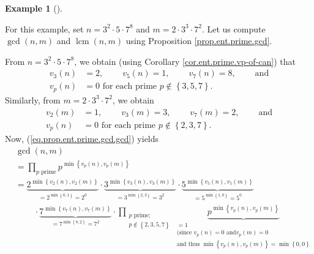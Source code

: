 \documentclass[numbers=enddot,12pt,final,onecolumn,notitlepage]{scrartcl}%
\numberwithin{exer}{subsection}
\theoremstyle{definition}
\newtheorem{exam}[theo]{Example}
\newenvironment{example}[1][]
{\begin{exam}[#1]\begin{leftbar}}
{\end{leftbar}\end{exam}}
\let\prodnonlimits\prod
\renewcommand{\prod}{\prodnonlimits\limits}
\begin{document}
\begin{example}
For this example, set $n=3^{2}\cdot5\cdot7^{8}$ and $m=2\cdot3^{3}\cdot7^{2}$.
Let us compute $\gcd\left(  n,m\right)  $ and $\operatorname{lcm}\left(
n,m\right)  $ using Proposition \ref{prop.ent.prime.gcd}.

From $n=3^{2}\cdot5\cdot7^{8}$, we obtain (using Corollary
\ref{cor.ent.prime.vp-of-can}) that%
\begin{align*}
v_{3}\left(  n\right)   &  =2,\ \ \ \ \ \ \ \ \ \ v_{5}\left(  n\right)
=1,\ \ \ \ \ \ \ \ \ \ v_{7}\left(  n\right)
=8,\ \ \ \ \ \ \ \ \ \ \text{and}\\
v_{p}\left(  n\right)   &  =0\text{ for each prime }p\notin\left\{
3,5,7\right\}  .
\end{align*}
Similarly, from $m=2\cdot3^{3}\cdot7^{2}$, we obtain%
\begin{align*}
v_{2}\left(  m\right)   &  =1,\ \ \ \ \ \ \ \ \ \ v_{3}\left(  m\right)
=3,\ \ \ \ \ \ \ \ \ \ v_{7}\left(  m\right)
=2,\ \ \ \ \ \ \ \ \ \ \text{and}\\
v_{p}\left(  n\right)   &  =0\text{ for each prime }p\notin\left\{
2,3,7\right\}  .
\end{align*}
Now, (\ref{eq.prop.ent.prime.gcd.gcd}) yields%
\begin{align*}
&  \gcd\left(  n,m\right) \\
&  =\prod_{p\text{ prime}}p^{\min\left\{  v_{p}\left(  n\right)  ,v_{p}\left(
m\right)  \right\}  }\\
&  =\underbrace{2^{\min\left\{  v_{2}\left(  n\right)  ,v_{2}\left(  m\right)
\right\}  }}_{=2^{\min\left\{  0,1\right\}  }=2^{0}}\cdot\underbrace{3^{\min
\left\{  v_{3}\left(  n\right)  ,v_{3}\left(  m\right)  \right\}  }}%
_{=3^{\min\left\{  2,3\right\}  }=3^{2}}\cdot\underbrace{5^{\min\left\{
v_{5}\left(  n\right)  ,v_{5}\left(  m\right)  \right\}  }}_{=5^{\min\left\{
1,0\right\}  }=5^{0}}\\
&  \ \ \ \ \ \ \ \ \ \ \cdot\underbrace{7^{\min\left\{  v_{7}\left(  n\right)
,v_{7}\left(  m\right)  \right\}  }}_{=7^{\min\left\{  8,2\right\}  }=7^{2}%
}\cdot\prod_{\substack{p\text{ prime;}\\p\notin\left\{  2,3,5,7\right\}
}}\underbrace{p^{\min\left\{  v_{p}\left(  n\right)  ,v_{p}\left(  m\right)
\right\}  }}_{\substack{=1\\\text{(since }v_{p}\left(  n\right)  =0\text{ and
}v_{p}\left(  m\right)  =0\\\text{and thus }\min\left\{  v_{p}\left(
n\right)  ,v_{p}\left(  m\right)  \right\}  =\min\left\{  0,0\right\}
}}
\end{align*}
\end{example}
\end{document}
